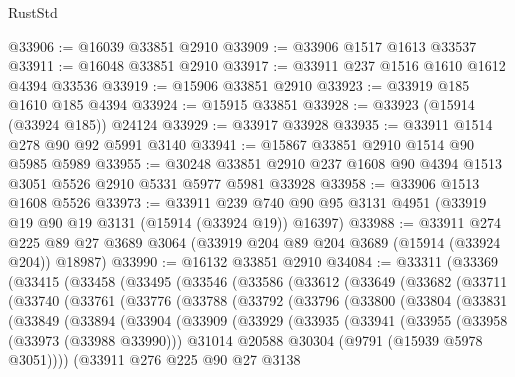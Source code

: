 \begin{lexlean}{RustStd}
\begin{coremodule}
@33906 := @16039 @33851 @2910
@33909 := @33906 @1517 @1613 @33537
@33911 := @16048 @33851 @2910
@33917 := @33911 @237 @1516 @1610 @1612 @4394 @33536
@33919 := @15906 @33851 @2910
@33923 := @33919 @185 @1610 @185 @4394
@33924 := @15915 @33851
@33928 := @33923 (@15914 (@33924 @185)) @24124
@33929 := @33917 @33928
@33935 := @33911 @1514 @278 @90 @92 @5991 @3140
@33941 := @15867 @33851 @2910 @1514 @90 @5985 @5989
@33955 := @30248 @33851 @2910 @237 @1608 @90 @4394 @1513 @3051 @5526 @2910 @5331 @5977 @5981 @33928
@33958 := @33906 @1513 @1608 @5526
@33973 := @33911
    @239
    @740
    @90
    @95
    @3131
    @4951
    (@33919 @19 @90 @19 @3131 (@15914 (@33924 @19)) @16397)
@33988 := @33911
    @274
    @225
    @89
    @27
    @3689
    @3064
    (@33919 @204 @89 @204 @3689 (@15914 (@33924 @204)) @18987)
@33990 := @16132 @33851 @2910
@34084 := @33311
    (@33369
      (@33415
        (@33458
          (@33495
            (@33546
              (@33586
                (@33612
                  (@33649
                    (@33682
                      (@33711
                        (@33740
                          (@33761
                            (@33776
                              (@33788
                                (@33792
                                  (@33796
                                    (@33800
                                      (@33804
                                        (@33831
                                          (@33849
                                            (@33894
                                              (@33904
                                                (@33909
                                                  (@33929
                                                    (@33935
                                                      (@33941
                                                        (@33955
                                                          (@33958 (@33973 (@33988 @33990)))
                                                          @31014
                                                          @20588
                                                          @30304
                                                          (@9791 (@15939 @5978 @3051))))
                                                      (@33911
                                                        @276
                                                        @225
                                                        @90
                                                        @27
                                                        @3138

\end{coremodule}
\end{lexlean}
